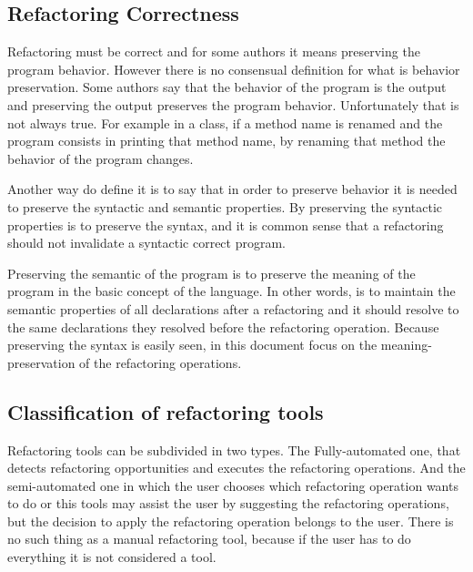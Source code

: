 \subsection{Refactoring Correctness}
Refactoring must be correct and for some authors it means preserving the program behavior. %
However there is no consensual definition for what is behavior preservation.
Some authors say that the behavior of the program is the output and preserving the output preserves the program behavior. 
Unfortunately that is not always true. \cite{erb2010survey} 
For example in a class, if a method name is renamed and the program consists in printing that method name, by renaming that method the behavior of the program changes.

Another way do define it is to say that in order to preserve behavior it is needed to preserve the syntactic and semantic properties.
By preserving the syntactic properties is to preserve the syntax, and it is common sense that a refactoring should not invalidate a syntactic correct program.

Preserving the semantic of the program is to preserve the meaning of the program in the basic concept of the language. 
In other words, is to  maintain the semantic properties of all declarations after a refactoring and it should resolve to the same declarations they resolved before the refactoring operation.
Because preserving the syntax is easily seen, in this document focus on the meaning-preservation of the refactoring operations. 






\subsection{Classification of refactoring tools} %
Refactoring tools can be subdivided in two types.
The Fully-automated one, that detects refactoring opportunities and executes the refactoring operations. And the semi-automated one in which the user chooses which refactoring operation wants to do or this tools may assist the user by suggesting the refactoring operations, but the decision to apply the refactoring operation belongs to the user. \cite{erb2010survey}
There is no such thing as a manual refactoring tool, because if the user has to do everything it is not considered a tool.
